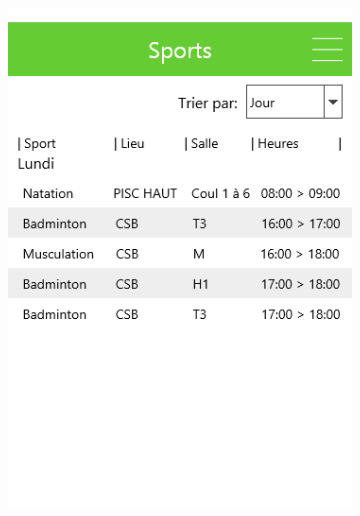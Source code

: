 \documentclass{eplmastersthesis}
\begin{document}
\begin{figure}[H]
\begin{subfigure}[b]{0.3\textwidth}
        \includegraphics[width=\textwidth]{Images/InVision/sports.png}
    \end{subfigure}
\end{figure}
\end{document}
